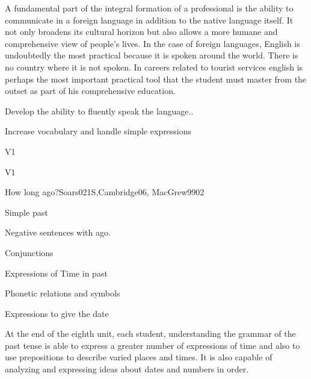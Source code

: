 \begin{syllabus}


\begin{justification}
A fundamental part of the integral formation of a professional is the ability to communicate in a foreign language in addition to the native language itself. It not only broadens its cultural horizon but also allows a more humane and comprehensive view of people's lives. In the case of foreign languages, English is undoubtedly the most practical because it is spoken around the world. There is no country where it is not spoken.
In careers related to tourist services english is perhaps the most important practical tool that the student must master from the outset as part of his comprehensive education.
\end{justification}

\begin{goals}
\item Develop the ability to fluently speak the language..
\item Increase vocabulary and handle simple expressions
\end{goals}

\begin{outcomes}{V1}
\item {}
\end{outcomes}

\begin{competences}{V1}
    \item {}
\end{competences}

\begin{unit}{How long ago?}{}{Soars021S,Cambridge06, MacGrew99}{0}{2}
   \begin{topics}
      \item Simple past
      \item Negative sentences with ago.
      \item Conjunctions
      \item Expressions of Time in past
      \item Phonetic relations and symbols
      \item Expressions to give the date
   \end{topics}

   \begin{learningoutcomes}
      \item At the end of the eighth unit, each student, understanding the grammar of the past tense is able to express a greater number of expressions of time and also to use prepositions to describe varied places and times. It is also capable of analyzing and expressing ideas about dates and numbers in order. 
   \end{learningoutcomes}


\end{unit}
\end{syllabus}
